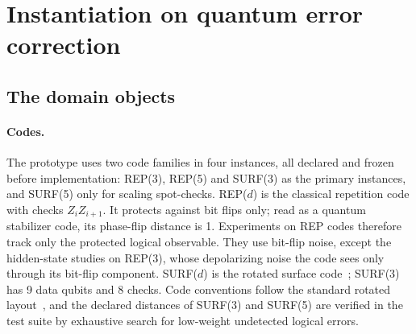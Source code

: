 \section{Instantiation on quantum error correction}
\label{sec:instantiation}

\subsection{The domain objects}
\label{sec:domain}

\paragraph{Codes.} The prototype uses two code families in four instances, all declared and frozen before implementation: REP(3), REP(5) and SURF(3) as the primary instances, and SURF(5) only for scaling spot-checks. %
REP($d$) is the classical repetition code with checks $Z_iZ_{i+1}$. It protects against bit flips only; read as a quantum stabilizer code, its phase-flip distance is 1. Experiments on REP codes therefore track only the protected logical observable. They use bit-flip noise, except the hidden-state studies on REP(3), whose depolarizing noise the code sees only through its bit-flip component. SURF($d$) is the rotated surface code~\cite{kitaev2003anyons,bravyi1998boundary,dennis2002topological}; SURF(3) has 9 data qubits and 8 checks. %
Code conventions follow the standard rotated layout~\cite{fowler2012surfacecodes,tomita2014lowdistance}, and the declared distances of SURF(3) and SURF(5) are verified in the test suite by exhaustive search for low-weight undetected logical errors.

